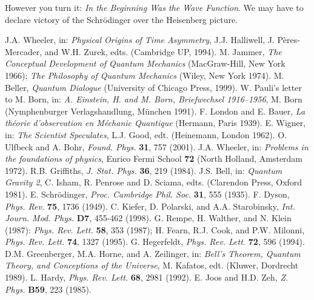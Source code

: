 However you turn it: {\it In the Beginning Was the Wave Function}.
We may have to declare victory of the Schr\"odinger over the
Heisenberg picture.

 
\begin{thebibliography}{99}

J.A. Wheeler, in: {\it Physical Origins of Time Asymmetry}, J.J.
Halliwell, J. P\`eres-Mercader, and W.H. Zurek, edts. (Cambridge UP,
1994).
    M. Jammer, {\em The Conceptual Development of Quantum Mechanics}
(MacGraw-Hill, New York 1966); {\em The Philosophy of Quantum
Mechanics} (Wiley, New York 1974).
    M. Beller, {\em Quantum Dialogue} (University of Chicago Press,
1999).
W. Pauli's letter to M. Born, in: {\it A. Einstein, H. and M. Born,
   Briefwechsel 1916--1956}, M. Born  (Nymphenburger Verlagshandlung,
M\"unchen 1991).
    F. London and E. Bauer, {\em La th\'eorie d'observation en
M\'echanic Quantique} (Hermann, Paris 1939).
    E. Wigner, in: {\it The Scientist
Speculates}, L.J. Good, edt. (Heinemann, London 1962).
O. Ulfbeck and A. Bohr,
{\it Found. Phys.} {\bf 31}, 757 (2001).
J.A. Wheeler, in: {\it Problems in the foundations of physics}, Enrico
Fermi School {\bf 72} (North Holland, Amsterdam 1972).
R.B. Griffiths,
{\it J. Stat. Phys.}
   {\bf 36}, 219 (1984).
J.S. Bell,
  in: {\it Quantum Gravity 2}, C. Isham, R. Penrose and D. Sciama, edts.
(Clarendon Press, Oxford 1981).
E. Schr\"odinger,
{\it Proc. Cambridge Phil. Soc.}  {\bf 31}, 555 (1935).
F. Dyson,
{\it Phys. Rev.} {\bf 75}, 1736 (1949).
C. Kiefer, D. Polarski, and A.A. Starobinsky, {\it Int. Journ. Mod.
Phys.} {\bf D7}, 455-462 (1998).
G. Rempe, H. Walther,  and N. Klein (1987):
{\it Phys. Rev. Lett.} {\bf 58}, 353 (1987);  H. Fearn, R.J. Cook,
  and P.W. Milonni,
{\it Phys. Rev. Lett.} {\bf 74}, 1327 (1995).
G. Hegerfeldt,
{\it Phys. Rev. Lett.}  {\bf 72}, 596 (1994).
D.M. Greenberger, M.A. Horne, and A. Zeilinger, in: {\it Bell's
Theorem, Quantum Theory, and Conceptions of the Universe}, M.
Kafatos, edt. (Kluwer, Dordrecht 1989).
L. Hardy, {\it Phys. Rev. Lett.} {\bf 68}, 2981 (1992).
E. Joos and H.D. Zeh,
{\it Z. Phys.} {\bf B59}, 223 (1985).

\end{thebibliography}
